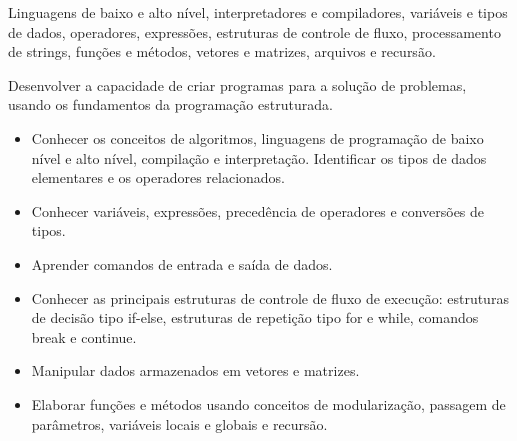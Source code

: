 \newenvironment{bibcomplementar}{
	\vspace{0.5em}
	\noindent\begin{tabularx}{\linewidth}{ X }
		\cellcolor{gray!10}\normalsize\textbf{BIBLIOGRAFIA COMPLEMENTAR}
	\end{tabularx}
	\vspace{-1em}
	\begin{flushleft}	
	\begin{itemize}[label={},leftmargin=0.1em, itemsep=0.75em]}{
	\end{itemize}
	\end{flushleft}
}
	
	\begin{pud}
	
	
	\ementa
	Linguagens de baixo e alto nível, interpretadores e compiladores, variáveis e tipos de dados, operadores, expressões, estruturas de controle de fluxo, processamento de strings, funções e métodos, vetores e matrizes, arquivos e recursão.
	
	\objetivos	
	Desenvolver a capacidade de criar programas para a solução de problemas, usando os fundamentos da programação estruturada.
	
	\begin{itemize}
		\item  Conhecer os conceitos de algoritmos, linguagens de programação de baixo nível e alto nível, compilação e interpretação.
		Identificar os tipos de dados elementares e os operadores relacionados.
		
		\item Conhecer variáveis,  expressões, precedência de operadores e conversões de tipos.
		
		\item Aprender comandos de entrada e saída de dados.
		
		\item Conhecer as principais estruturas de controle de fluxo de execução: estruturas de decisão tipo if-else, estruturas de repetição tipo for e while, comandos break e continue.
		
		\item Manipular dados armazenados em vetores e matrizes.
		
		\item Elaborar funções e métodos usando conceitos de modularização, passagem de parâmetros, variáveis locais e globais e recursão.
		

\end{itemize}
\end{pud}
